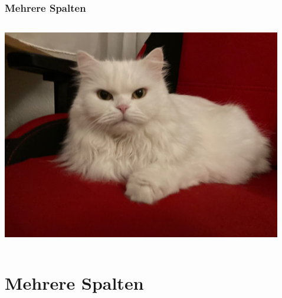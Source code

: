 \documentclass[12pt,ngerman]{beamer}
\begin{document}
\begin{frame}
\frametitle{Mehrere Spalten}

\begin{columns}
\begin{column}{0.33\textwidth}
\includegraphics[width=\textwidth]{Sampledocument/Images/Katze}
\end{column}
\begin{column}{0.33\textwidth}
\scriptsize\blindtext
\end{column}
\begin{column}{0.33\textwidth}
\scriptsize\blindtext
\end{column}
\end{columns}

\end{frame}

\section{Mehrere Spalten}
\end{document}
